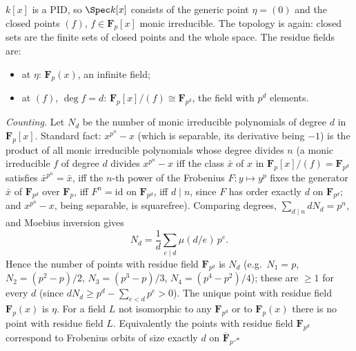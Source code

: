 \documentclass[11pt]{article}
\begin{document}
\pf
$k[x]$ is a PID, so $\Spec k[x]$ consists of the generic point $\eta=(0)$ and the closed points $(f)$, $f\in\mathbf F_p[x]$ monic irreducible. The topology is again: closed sets are the finite sets of closed points and the whole space. The residue fields are:
\begin{itemize}
\item at $\eta$: $\mathbf F_p(x)$, an infinite field;
\item at $(f)$, $\deg f=d$: $\mathbf F_p[x]/(f)\cong\mathbf F_{p^d}$, the field with $p^d$ elements.
\end{itemize}
\emph{Counting.} Let $N_d$ be the number of monic irreducible polynomials of degree $d$ in $\mathbf F_p[x]$. Standard fact: $x^{p^n}-x$ (which is separable, its derivative being $-1$) is the product of all monic irreducible polynomials whose degree divides $n$ (a monic irreducible $f$ of degree $d$ divides $x^{p^n}-x$ iff the class $\bar x$ of $x$ in $\mathbf F_p[x]/(f)=\mathbf F_{p^d}$ satisfies $\bar x^{p^n}=\bar x$, iff the $n$-th power of the Frobenius $F:y\mapsto y^p$ fixes the generator $\bar x$ of $\mathbf F_{p^d}$ over $\mathbf F_p$, iff $F^n=\mathrm{id}$ on $\mathbf F_{p^d}$, iff $d\mid n$, since $F$ has order exactly $d$ on $\mathbf F_{p^d}$; and $x^{p^n}-x$, being separable, is squarefree). Comparing degrees, $\sum_{d\mid n}dN_d=p^n$, and Moebius inversion gives
\[N_d=\frac1d\sum_{e\mid d}\mu(d/e)\,p^e.\]
Hence the number of points with residue field $\mathbf F_{p^d}$ is $N_d$ (e.g.\ $N_1=p$, $N_2=(p^2-p)/2$, $N_3=(p^3-p)/3$, $N_4=(p^4-p^2)/4$); these are $\ge1$ for every $d$ (since $d N_d\ge p^d-\sum_{e<d}p^e>0$). The unique point with residue field $\mathbf F_p(x)$ is $\eta$. For a field $L$ not isomorphic to any $\mathbf F_{p^d}$ or to $\mathbf F_p(x)$ there is no point with residue field $L$. Equivalently the points with residue field $\mathbf F_{p^d}$ correspond to Frobenius orbits of size exactly $d$ on $\overline{\mathbf F}_p$.\hfill$\square$
\end{document}
